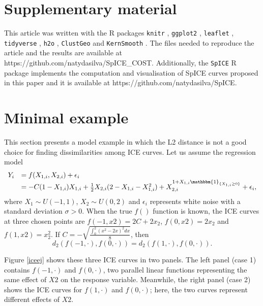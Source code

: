 \documentclass[smallextended,natbib]{svjour3}\usepackage[]{graphicx}\usepackage[]{xcolor}
\newcommand{\1}[1]{\mathbbm{1}_{#1}}
\begin{document}
\section{ Supplementary material }
This article was written with the R packages \texttt{knitr} \citep{knitr}, \texttt{ggplot2} \citep{hadley:2016}, \texttt{leaflet} \citep{leaflet}, \texttt{tidyverse} \citep{tidyverse}, \texttt{h2o} \citep{h2o}, \texttt{ClustGeo} \citep{clustGeo} and
 \texttt{KernSmooth} \citep{KernSmooth}. The files needed to reproduce the article and the results are available at https://github.com/natydasilva/SpICE\_COST. Additionally, the \texttt{SpICE} R package implements the computation and visualisation of SpICE curves proposed in this paper and  it is available at  https://github.com/natydasilva/SpICE. 











\appendix

\section{Minimal example \label{toyexample}}  
This section presents a model example in which the L2 distance is not a good choice for finding dissimilarities among ICE curves. Let us assume the regression model 
\[\begin{array}{cl}
  Y_i   &  = f(X_{1,i}, X_{2,i}) + \epsilon_i  \\
     & = -C(1-X_{1,i})X_{1,i} + \frac{1}{2}X_{2,i}(2- X_{1,i}-X^2_{1,i}) +X_{2,i}^{1+X_{1,i} \1{ \{X_{1,i}\geq 0\} } }  + \epsilon_i,
\end{array}\]
where $X_1 \sim U(-1,1)$, $X_2\sim U(0,2)$ and $\epsilon_i$ represents white noise with a standard deviation $\sigma>0$. When the true $f()$ function is known, the ICE curves at three chosen points are $f(-1,x2)= 2C+2x_2$, $f(0,x2)=2x_2$ and $f(1,x2)=x_2^2$. If $C= -\sqrt{ \frac{\int_0^2(x^2-2x)^2 dx}{8}}$, then 
$$d_2\left( f(-1,\cdot), f(0,\cdot)\right)= d_2\left( f(1,\cdot), f(0,\cdot)\right).$$

Figure \ref{iceej} shows these three ICE curves in two panels. The left panel (case 1) contains $f(-1,\cdot)$ and $f(0,\cdot)$, two parallel linear functions representing the same effect of $X2$ on the response variable. Meanwhile, the right panel (case 2) shows the ICE curves for $f(1,\cdot)$ and $f(0,\cdot)$; here, the two curves represent different effects of $X2$. 
\end{document}
